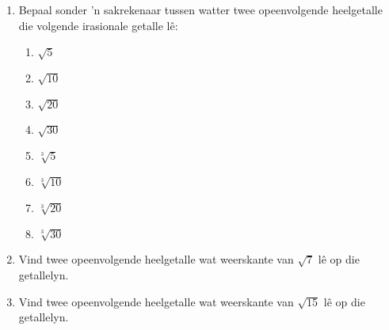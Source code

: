 \begin{eocexercises}{}
\begin{enumerate}[itemsep=5pt, label=\textbf{\arabic*}. ]
\item Bepaal sonder 'n sakrekenaar tussen watter twee opeenvolgende heelgetalle die volgende irasionale getalle l\^{e}:
\begin{multicols}{2}
    \begin{enumerate}[itemsep=5pt, label=\textbf{(\alph*)} ] 
    \item $\sqrt{5}$ 
    \item $\sqrt{10}$ 
    \item $\sqrt{20}$ 
    \item $\sqrt{30}$ 
    \item $\sqrt[3]{5}$ 
    \item $\sqrt[3]{10}$ 
    \item $\sqrt[3]{20}$ 
    \item $\sqrt[3]{30}$ 
    \end{enumerate}
\end{multicols}

\item  Vind twee opeenvolgende heelgetalle wat weerskante van $\sqrt{7}$ lê op die getallelyn.          
\item Vind twee opeenvolgende heelgetalle wat weerskante van $\sqrt{15}$ lê op die getallelyn.          





\end{enumerate}
\end{eocexercises}
